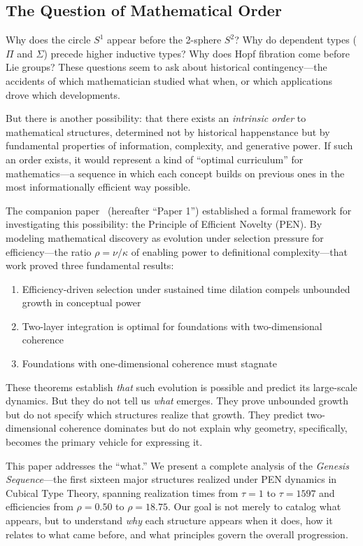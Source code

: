 \documentclass[11pt]{article}
\theoremstyle{definition}
\begin{document}
\subsection{The Question of Mathematical Order}

Why does the circle $S^1$ appear before the 2-sphere $S^2$? Why do dependent types ($\Pi$ and $\Sigma$) precede higher inductive types? Why does Hopf fibration come before Lie groups? These questions seem to ask about historical contingency—the accidents of which mathematician studied what when, or which applications drove which developments. 

But there is another possibility: that there exists an \emph{intrinsic order} to mathematical structures, determined not by historical happenstance but by fundamental properties of information, complexity, and generative power. If such an order exists, it would represent a kind of ``optimal curriculum'' for mathematics—a sequence in which each concept builds on previous ones in the most informationally efficient way possible.

The companion paper~\cite{lande2025unbounded} (hereafter ``Paper 1'') established a formal framework for investigating this possibility: the Principle of Efficient Novelty (PEN). By modeling mathematical discovery as evolution under selection pressure for efficiency—the ratio $\rho = \nu/\kappa$ of enabling power to definitional complexity—that work proved three fundamental results:
\begin{enumerate}
\item Efficiency-driven selection under sustained time dilation compels unbounded growth in conceptual power
\item Two-layer integration is optimal for foundations with two-dimensional coherence
\item Foundations with one-dimensional coherence must stagnate
\end{enumerate}

These theorems establish \emph{that} such evolution is possible and predict its large-scale dynamics. But they do not tell us \emph{what} emerges. They prove unbounded growth but do not specify which structures realize that growth. They predict two-dimensional coherence dominates but do not explain why geometry, specifically, becomes the primary vehicle for expressing it.

This paper addresses the ``what.'' We present a complete analysis of the \emph{Genesis Sequence}—the first sixteen major structures realized under PEN dynamics in Cubical Type Theory, spanning realization times from $\tau=1$ to $\tau=1597$ and efficiencies from $\rho=0.50$ to $\rho=18.75$. Our goal is not merely to catalog what appears, but to understand \emph{why} each structure appears when it does, how it relates to what came before, and what principles govern the overall progression.
\end{document}
